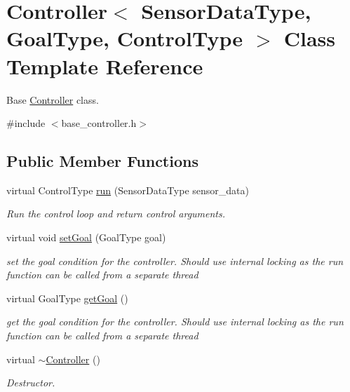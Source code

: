 \hypertarget{classController}{\section{Controller$<$ Sensor\-Data\-Type, Goal\-Type, Control\-Type $>$ Class Template Reference}
\label{classController}
}


Base \hyperlink{classController}{Controller} class.  




{\ttfamily \#include $<$base\-\_\-controller.\-h$>$}

\subsection*{Public Member Functions}
\begin{DoxyCompactItemize}
\item 
virtual Control\-Type \hyperlink{classController_a5caae261ff8a9f299cb8d220fbaf204b}{run} (Sensor\-Data\-Type sensor\-\_\-data)
\begin{DoxyCompactList}\small\item\em Run the control loop and return control arguments. \end{DoxyCompactList}\item 
virtual void \hyperlink{classController_a172aae7e2475b72fb2eb469ccd198387}{set\-Goal} (Goal\-Type goal)
\begin{DoxyCompactList}\small\item\em set the goal condition for the controller. Should use internal locking as the run function can be called from a separate thread \end{DoxyCompactList}\item 
virtual Goal\-Type \hyperlink{classController_a712cefd3af65956a9bd420641b175214}{get\-Goal} ()
\begin{DoxyCompactList}\small\item\em get the goal condition for the controller. Should use internal locking as the run function can be called from a separate thread \end{DoxyCompactList}\item 
virtual \hyperlink{classController_a86c5dbf78d3d948228c7c629e885151c}{$\sim$\-Controller} ()
\begin{DoxyCompactList}\small\item\em Destructor. \end{DoxyCompactList}\end{DoxyCompactItemize}
